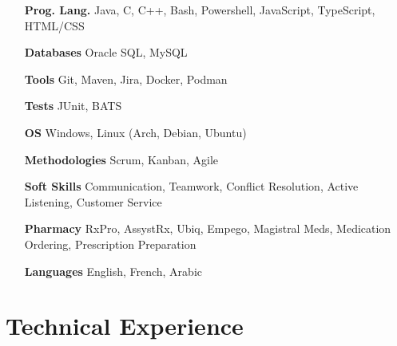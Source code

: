 \documentclass[letterpaper,10pt]{article}
\begin{document}
  \begin{multicols}{2}
    \begin{itemize}[itemsep=-2px, parsep=5pt, leftmargin=75pt]
      \item[\textbf{Prog. Lang.}] Java, C, C++, Bash, Powershell, JavaScript, TypeScript, HTML/CSS
      \item[\textbf{Databases}] Oracle SQL, MySQL
      \item[\textbf{Tools}] Git, Maven, Jira, Docker, Podman
      \item[\textbf{Tests}] JUnit, BATS
      \item[\textbf{OS}]  Windows, Linux (Arch, Debian, Ubuntu)
      \item[\textbf{Methodologies}]  Scrum, Kanban, Agile
      \item[\textbf{Soft Skills}]  Communication, Teamwork, Conflict Resolution, Active Listening, Customer Service
      \item[\textbf{Pharmacy}]  RxPro, AssystRx, Ubiq, Empego, Magistral Meds, Medication Ordering, Prescription Preparation
      \item[\textbf{Languages}]  English, French, Arabic
    \end{itemize}
  \end{multicols}


  \section{Technical Experience}
\end{document}
